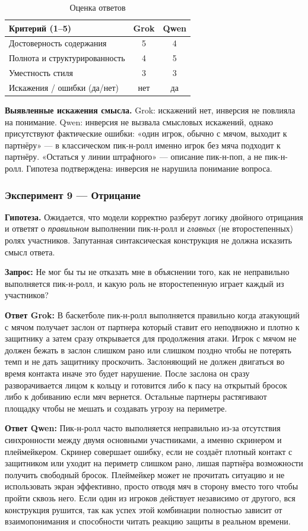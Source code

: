 \documentclass[a4paper, final]{article}
\newcommand{\scoretablefilled}[8]{%
    \vspace{4pt}
    \begin{table}[h!]
    \centering
    \small
    \begin{tabular}{|l|c|c|}
    \hline
    \textbf{Критерий (1--5)} & \textbf{Grok} & \textbf{Qwen} \\
    \hline
    Достоверность содержания & #1 & #2 \\
    \hline
    Полнота и структурированность & #3 & #4 \\
    \hline
    Уместность стиля & #5 & #6 \\
    \hline
    Искажения / ошибки (да/нет) & #7 & #8 \\
    \hline
    \end{tabular}
    \caption{Оценка ответов}
    \end{table}
    \vspace{2pt}
}
\begin{document}
\scoretablefilled{5}{4}{4}{5}{3}{3}{нет}{да}

\noindent\textbf{Выявленные искажения смысла.} Grok: искажений нет, инверсия не повлияла на понимание. Qwen: инверсия не вызвала смысловых искажений, однако присутствуют фактические ошибки: «один игрок, обычно с мячом, выходит к партнёру» — в классическом пик-н-ролл именно игрок без мяча подходит к партнёру. «Остаться у линии штрафного» — описание пик-н-поп, а не пик-н-ролл. Гипотеза подтверждена: инверсия не нарушила понимание вопроса.

\newpage

\subsubsection{Эксперимент 9 — Отрицание}

\noindent\textbf{Гипотеза.} Ожидается, что модели корректно разберут логику двойного отрицания и ответят о \emph{правильном} выполнении пик-н-ролл и \emph{главных} (не второстепенных) ролях участников. Запутанная синтаксическая конструкция не должна исказить смысл ответа.

\noindent\textbf{Запрос:} Не мог бы ты не отказать мне в объяснении того, как не неправильно выполняется пик-н-ролл, и какую роль не второстепенную играет каждый из участников?

\noindent\textbf{Ответ Grok:} В баскетболе пик-н-ролл выполняется правильно когда атакующий с мячом получает заслон от партнера который ставит его неподвижно и плотно к защитнику а затем сразу открывается для продолжения атаки. Игрок с мячом не должен бежать в заслон слишком рано или слишком поздно чтобы не потерять темп и не дать защитнику проскочить. Заслоняющий не должен двигаться во время контакта иначе это будет нарушение. После заслона он сразу разворачивается лицом к кольцу и готовится либо к пасу на открытый бросок либо к добиванию если мяч вернется. Остальные партнеры растягивают площадку чтобы не мешать и создавать угрозу на периметре.

\noindent\textbf{Ответ Qwen:} Пик-н-ролл часто выполняется неправильно из-за отсутствия синхронности между двумя основными участниками, а именно скринером и плеймейкером. Скринер совершает ошибку, если не создаёт плотный контакт с защитником или уходит на периметр слишком рано, лишая партнёра возможности получить свободный бросок. Плеймейкер может не прочитать ситуацию и не использовать экран эффективно, просто отводя мяч в сторону вместо того чтобы пройти сквозь него. Если один из игроков действует независимо от другого, вся конструкция рушится, так как успех этой комбинации полностью зависит от взаимопонимания и способности читать реакцию защиты в реальном времени.
\end{document}
